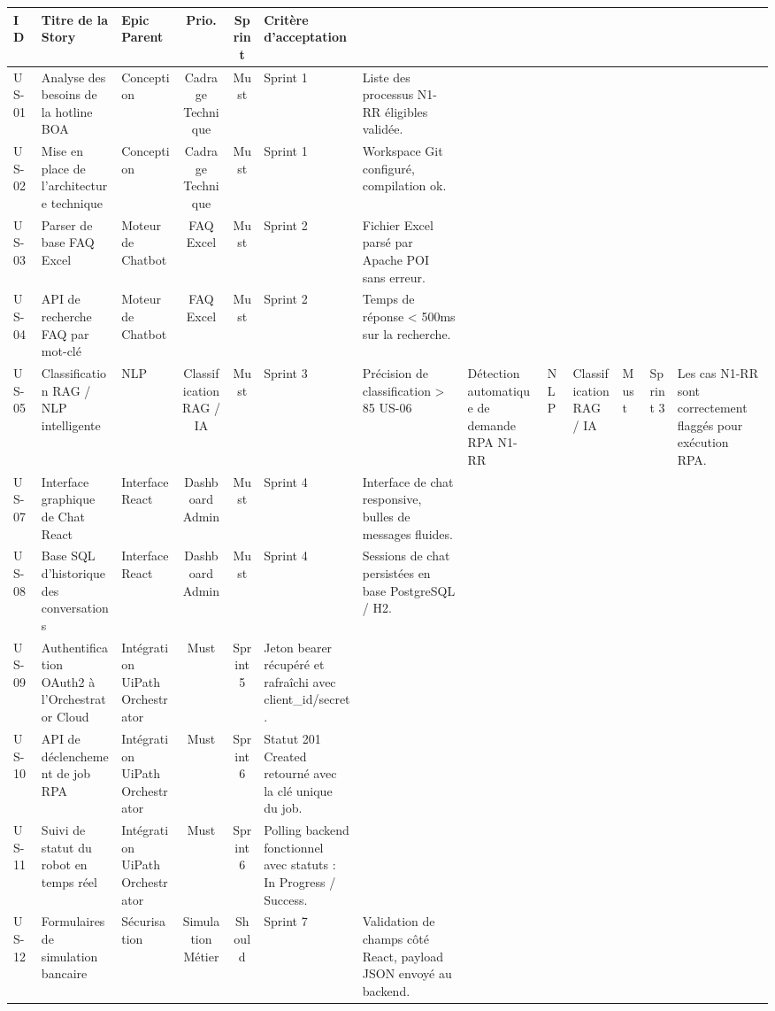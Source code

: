 \begin{table}[htbp]
\centering
\scriptsize
\begin{tabular}{|l|p{3.5cm}|p{3.5cm}|c|c|p{3.5cm}|}
\hline
\textbf{ID} & \textbf{Titre de la Story} & \textbf{Epic Parent} & \textbf{Prio.} & \textbf{Sprint} & \textbf{Critère d'acceptation} \\ \hline
US-01 & Analyse des besoins de la hotline BOA & Conception & Cadrage Technique & Must & Sprint 1 & Liste des processus N1-RR éligibles validée. \\ \hline
US-02 & Mise en place de l'architecture technique & Conception & Cadrage Technique & Must & Sprint 1 & Workspace Git configuré, compilation ok. \\ \hline
US-03 & Parser de base FAQ Excel & Moteur de Chatbot & FAQ Excel & Must & Sprint 2 & Fichier Excel parsé par Apache POI sans erreur. \\ \hline
US-04 & API de recherche FAQ par mot-clé & Moteur de Chatbot & FAQ Excel & Must & Sprint 2 & Temps de réponse < 500ms sur la recherche. \\ \hline
US-05 & Classification RAG / NLP intelligente & NLP & Classification RAG / IA & Must & Sprint 3 & Précision de classification > 85%
US-06 & Détection automatique de demande RPA N1-RR & NLP & Classification RAG / IA & Must & Sprint 3 & Les cas N1-RR sont correctement flaggés pour exécution RPA. \\ \hline
US-07 & Interface graphique de Chat React & Interface React & Dashboard Admin & Must & Sprint 4 & Interface de chat responsive, bulles de messages fluides. \\ \hline
US-08 & Base SQL d'historique des conversations & Interface React & Dashboard Admin & Must & Sprint 4 & Sessions de chat persistées en base PostgreSQL / H2. \\ \hline
US-09 & Authentification OAuth2 à l'Orchestrator Cloud & Intégration UiPath Orchestrator & Must & Sprint 5 & Jeton bearer récupéré et rafraîchi avec client_id/secret. \\ \hline
US-10 & API de déclenchement de job RPA & Intégration UiPath Orchestrator & Must & Sprint 6 & Statut 201 Created retourné avec la clé unique du job. \\ \hline
US-11 & Suivi de statut du robot en temps réel & Intégration UiPath Orchestrator & Must & Sprint 6 & Polling backend fonctionnel avec statuts : In Progress / Success. \\ \hline
US-12 & Formulaires de simulation bancaire & Sécurisation & Simulation Métier & Should & Sprint 7 & Validation de champs côté React, payload JSON envoyé au backend. \\ \hline

\end{tabular}
\end{table}

